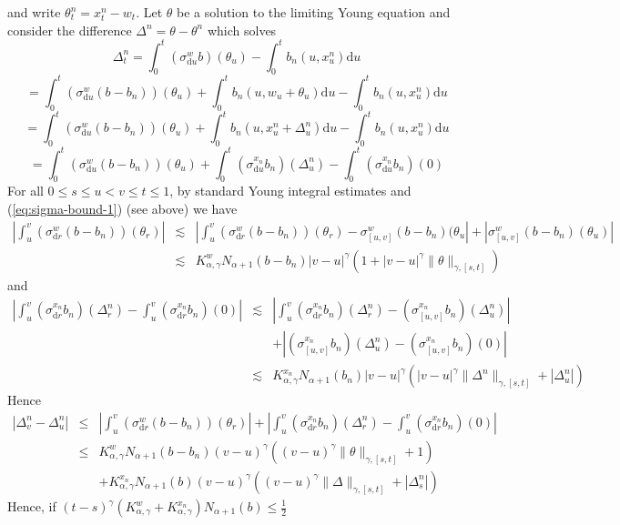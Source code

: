 \documentclass[11pt,a4paper,draft,reqno]{amsart}
\theoremstyle{definition}
\newcommand{\dd}{\mathrm{d}}
\begin{document}
and write $\theta^n_t = x^n_t - w_t$. Let $\theta$ be a solution to the limiting Young equation and consider the difference $\Delta^n = \theta-\theta^n$ which solves 
$$
\Delta^n_t = \int_0^t (\sigma^w_{\dd u} b)(\theta_u) - \int_0^t b_n(u,x^n_u) \dd u 
$$
$$
= \int_0^t (\sigma^w_{\dd u} (b-b_n))(\theta_u) + \int_0^t b_n(u,w_u + \theta_u) \dd u - \int_0^t b_n(u,x^n_u) \dd u
$$
$$
= \int_0^t (\sigma^w_{\dd u} (b-b_n))(\theta_u) + \int_0^t b_n(u,x^n_u + \Delta^n_u) \dd u - \int_0^t b_n(u,x^n_u) \dd u
$$
$$
= \int_0^t (\sigma^w_{\dd u} (b-b_n))(\theta_u) + \int_0^t (\sigma^{x_n}_{\dd u}b_n)(\Delta^n_u) - \int_0^t (\sigma^{x_n}_{\dd u}b_n)(0)
$$
For all $0\le s \le u < v \le t \le 1$, by standard Young integral estimates and (\ref{eq:sigma-bound-1}) (see above) we have
\begin{eqnarray*}
\left|\int_u^v (\sigma^w_{\dd r} (b-b_n))(\theta_r)\right| 
&\lesssim&
\left|\int_u^v (\sigma^w_{\dd r} (b-b_n))(\theta_r)-\sigma_{[u,v]}^w(b-b_n)(\theta_u\right| +\left|\sigma_{[u,v]}^w(b-b_n)(\theta_u)\right|\\
&\lesssim&
K^w_{\alpha,\gamma} N_{\alpha+1}(b-b_n)  |v-u|^\gamma(1+|v-u|^\gamma\|\theta\|_{\gamma,[s,t]})
\end{eqnarray*}
and
\begin{eqnarray*}
\left|\int_u^v (\sigma^{x_n}_{\dd r}b_n)(\Delta^n_r) - \int_u^v (\sigma^{x_n}_{\dd r}b_n)(0)\right| 
&\lesssim& 
\left|\int_u^v (\sigma^{x_n}_{\dd r}b_n)(\Delta^n_r) - \left(\sigma^{x_n}_{[u,v]}b_n\right)(\Delta^n_u)\right|\\
&&
+\left|\left(\sigma^{x_n}_{[u,v]}b_n\right)(\Delta^n_u)-\left(\sigma^{x_n}_{[u,v]}b_n\right)(0)\right|\\ 
&\lesssim&
K^{x_n}_{\alpha,\gamma} N_{\alpha+1}(b_n) |v-u|^\gamma \left(|v-u|^\gamma\|\Delta^n\|_{\gamma,[s,t]} + |\Delta^n_u| \right)
\end{eqnarray*}
Hence
\begin{eqnarray*}
\left|\Delta^n_v-\Delta^n_u\right|
&\le&
\left|\int_u^v (\sigma^w_{\dd r} (b-b_n))(\theta_r)\right| + \left|\int_u^v (\sigma^{x_n}_{\dd r}b_n)(\Delta^n_r) - \int_u^v (\sigma^{x_n}_{\dd r}b_n)(0)\right|\\
&\le&
 K^{w}_{\alpha,\gamma} N_{\alpha+1}(b-b_n)(v-u)^\gamma\left((v-u)^\gamma\|\theta\|_{\gamma, [s,t]}+1\right)\\
&&
 +  K^{x_n}_{\alpha,\gamma} N_{\alpha+1}(b)(v-u)^\gamma\left((v-u)^\gamma\|\Delta\|_{\gamma,[s,t]}+|\Delta^n_s|\right)
\end{eqnarray*}
Hence, if $(t-s)^\gamma ( K^{w}_{\alpha,\gamma}+ K^{x_n}_{\alpha,\gamma})N_{\alpha+1}(b)\le \frac12$
\end{document}
